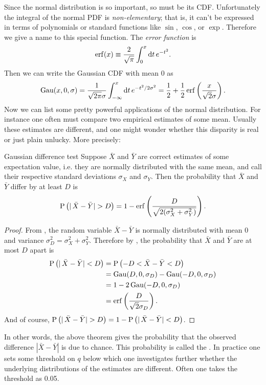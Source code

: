 Since the normal distribution is so important, so must be its CDF.
Unfortunately the integral of the normal PDF is {\it non-elementary};
 that is, it can't be expressed in terms of 
polynomials or standard
functions like $\sin$, $\cos$, or $\exp$. Therefore we give a name
to this special function.
The {\it error function} is
\begin{equation}
  \erf(x)\equiv\frac{2}{\sqrt{\pi}}\int_0^x\dd{t}e^{-t^2}.
\end{equation}
Then we can write the Gaussian CDF with mean 0 as
\begin{equation}
  \label{eq:gaussCDF}
  \Gau(x,0,\sigma)=\frac{1}{\sqrt{2\pi}\sigma}
                   \int_{-\infty}^x\dd{t}e^{-t^2/2\sigma^2}
                  =\frac{1}{2}+\frac{1}{2}
                   \erf\left(\frac{x}{\sqrt{2}\sigma}\right).
\end{equation}
Now we can list some pretty powerful applications of the normal distribution.
For instance one often must compare two empirical estimates of some mean.
Usually these estimates are different, and one might wonder whether this
disparity is real or just plain unlucky. More precisely:
\begin{theorem}{Gaussian difference test}{}\label{thm:gaudif}
  Suppose $\bar{X}$ and $\bar{Y}$ are correct estimates of 
  some expectation
  value, i.e. they are normally distributed with the same mean, and call
  their respective standard deviations $\sigma_X$ and
  $\sigma_Y$. Then the probability that $\bar{X}$ 
  and $\bar{Y}$ differ by at least $D$ is
  \begin{equation*}
    \pr{|\,\bar{X}-\bar{Y}|>D}=1-\erf\left(\frac{D}
       {\sqrt{2(\sigma_X^2+\sigma_Y^2)}}\right).
  \end{equation*}
  \begin{proof}
    From , the random variable
    $\bar{X}-\bar{Y}$ is normally distributed with mean 0 
    and variance $\sigma_D^2=\sigma_X^2+\sigma_Y^2$. Therefore by
    , the probability that $\bar{X}$ and 
    $\bar{Y}$ are at most $D$ apart is
    \begin{equation*}
      \begin{aligned}
        \pr{|\,\bar{X}-\bar{Y}|<D}
            &=\pr{-D<\bar{X}-\bar{Y}<D}\\
            &=\Gau(D,0,\sigma_D)-\Gau(-D,0,\sigma_D)\\
            &=1-2\Gau(-D,0,\sigma_D)\\
            &=\erf\left(\frac{D}{\sqrt{2}\sigma_D}\right).
      \end{aligned}
    \end{equation*}
    And of course, $\pr{|\,\bar{X}-\bar{Y}|>D}
     =1-\pr{|\,\bar{X}-\bar{Y}|<D}$.
  \end{proof}
\end{theorem}
In other words, the above theorem gives the probability that the
observed difference $|\bar{X}-\bar{Y}|$ is due to chance. This probability
is called the . In practice one sets some 
threshold on $q$ below which one investigates further whether the 
underlying distributions of the estimates are different. Often one 
takes the threshold as 0.05.

